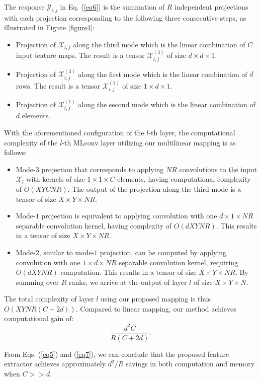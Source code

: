 \documentclass[conference,usletter]{IEEEtran}
\begin{document}
The response $\mathcal{Y}_{i,j}$ in Eq. (\ref{eq6}) is the summation of $R$ independent projections with each projection corresponding to the following three consecutive steps, as illustrated in Figure \ref{figure1}:
\begin{itemize}
	\item Projection of $\mathcal{X}_{i,j}$ along the third mode which is the linear combination of $C$ input feature maps. The result is a tensor $\mathcal{X}_{i,j}^{(3)}$ of size $d\times d\times 1$.
	\item Projection of $\mathcal{X}_{i,j}^{(3)}$ along the first mode which is the linear combination of $d$ rows. The result is a tensor $\mathcal{X}_{i,j}^{(1)}$ of size $1\times d\times 1$.
	\item Projection of $\mathcal{X}_{i,j}^{(1)}$ along the second mode which is the linear combination of $d$ elements.
\end{itemize}
With the aforementioned configuration of the $l$-th layer, the computational complexity of the $l$-th MLconv layer utilizing our multilinear mapping is as follows:
\begin{itemize}
	\item Mode-$3$ projection that corresponds to applying $NR$ convolutions to the input $\mathcal{X}_l$ with kernels of size $1\times 1\times C$ elements, having computational complexity of $O(XYCNR)$. The output of the projection along the third mode is a tensor of size $X\times Y\times NR$.
	\item Mode-$1$ projection is equivalent to applying convolution with one $d\times 1\times NR$ separable convolution kernel, having complexity of $O(dXYNR)$. This results in a tensor of size $X\times Y\times NR$.
	\item Mode-$2$, similar to mode-$1$ projection, can be computed by applying convolution with one $1\times d\times NR$ separable convolution kernel, requiring $O(dXYNR)$ computation. This results in a tensor of size $X\times Y\times NR$. By summing over $R$ ranks, we arrive at the output of layer $l$ of size $X\times Y\times N$.
\end{itemize}

The total complexity of layer $l$ using our proposed mapping is thus $O(XYNR(C+2d))$. Compared to linear mapping, our method achieves computational gain of:
\begin{equation}\label{eq7}
\frac{d^2C}{R(C+2d)}.
\end{equation}

From Eqs. (\ref{eq5}) and (\ref{eq7}), we can conclude that the proposed feature extractor achieves approximately $d^2/R$ savings in both computation and memory when $C>>d$.
\end{document}
